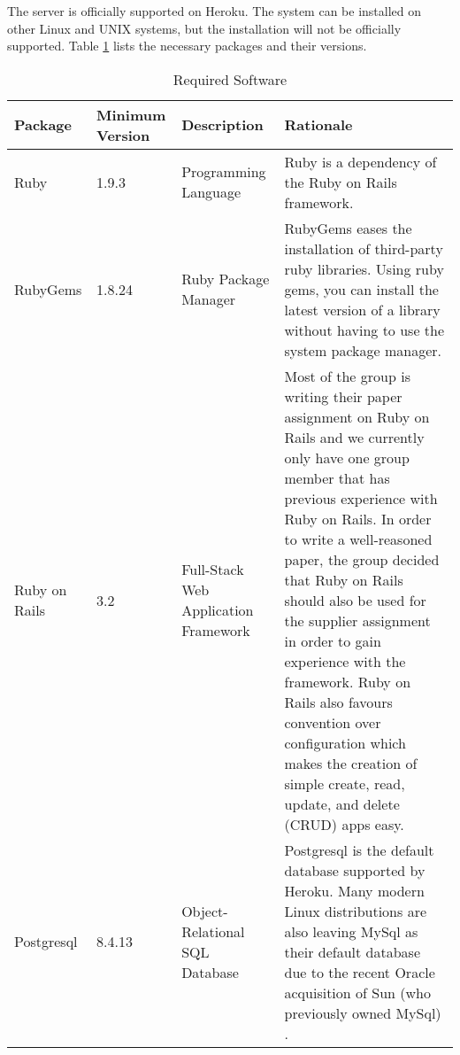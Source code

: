 The server is officially supported on Heroku. The system can be installed on other Linux and UNIX systems, but the installation will not be officially supported. Table \ref{serverRequirements} lists the necessary packages and their versions.
\begin{table}[!h]
	\begin{tabular}{|p{2cm}|p{2cm}|p{3cm}|p{6cm}|}
		\hline
		\textbf{Package} & \textbf{Minimum Version} & \textbf{Description} & \textbf{Rationale} \\
		\hline
		Ruby & 1.9.3 & Programming Language & Ruby is a dependency of the Ruby on Rails framework. \\
		\hline
		RubyGems & 1.8.24 & Ruby Package Manager & RubyGems eases the installation of third-party ruby libraries. Using ruby gems, you can install the latest version of a library without having to use the system package manager. \\
		\hline
		Ruby on Rails & 3.2 & Full-Stack Web Application Framework & Most of the group is writing their paper assignment on Ruby on Rails and we currently only have one group member that has previous experience with Ruby on Rails. In order to write a well-reasoned paper, the group decided that Ruby on Rails should also be used for the supplier assignment in order to gain experience with the framework. Ruby on Rails also favours convention over configuration which makes the creation of simple create, read, update, and delete (CRUD) apps easy. \\
		\hline
		Postgresql & 8.4.13 & Object-Relational SQL Database & Postgresql is the default database supported by Heroku. Many modern Linux distributions are also leaving MySql as their default database due to the recent Oracle acquisition of Sun (who previously owned MySql) \cite{fedoraMysql}. \\
		\hline
	\end{tabular}
	\caption{Required Software}
	\label{serverRequirements}
\end{table}
